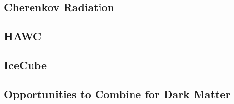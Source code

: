 \subsection{Cherenkov Radiation\label{sec:cherenkov}}

\subsection{HAWC\label{sec:hawc_intro}}

\subsection{IceCube\label{sec:ice3_intro}}

\subsection{Opportunities to Combine for Dark Matter\label{sec:ic3_hawc_combo}}

